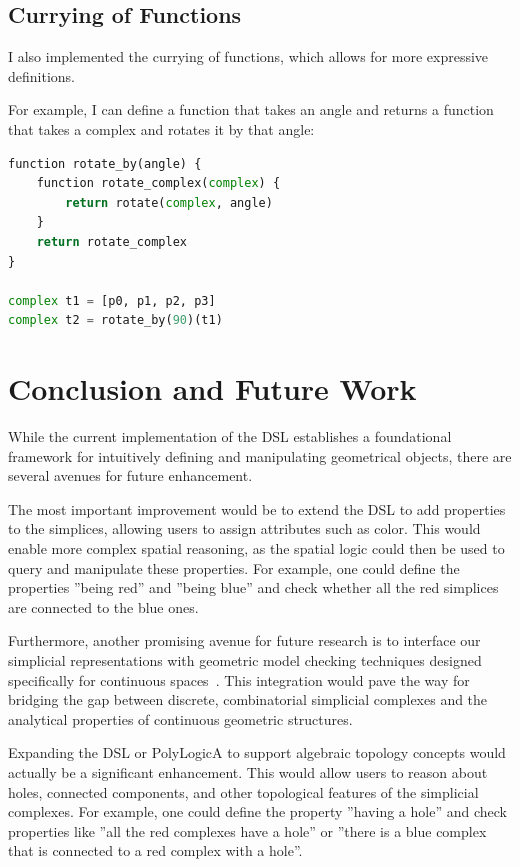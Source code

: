 \documentclass[11pt,a4paper]{article}
\begin{document}
\subsection{Currying of Functions}

I also implemented the currying of functions, which allows for more expressive definitions.

For example, I can define a function that takes an angle and returns a function that takes a complex and rotates it by that angle:

\newpage
    \begin{lstlisting}[language=Python, caption={DSL Code for Example 3}, label={lst:example3dsl}]
function rotate_by(angle) {
    function rotate_complex(complex) {
        return rotate(complex, angle)
    }
    return rotate_complex
}

complex t1 = [p0, p1, p2, p3]
complex t2 = rotate_by(90)(t1)

\end{lstlisting}

\section{Conclusion and Future Work}

While the current implementation of the DSL establishes a foundational framework for intuitively defining and manipulating geometrical objects, there are several avenues for future enhancement.

The most important improvement would be to extend the DSL to add properties to the simplices, allowing users to assign attributes such as color. This would enable more complex spatial reasoning, as the spatial logic could then be used to query and manipulate these properties. For example, one could define the properties ''being red'' and ''being blue'' and check whether all the red simplices are connected to the blue ones.

Furthermore, another promising avenue for future research is to interface our simplicial representations with geometric model checking techniques designed specifically for continuous spaces~\cite{geometric-model-checking}. This integration would pave the way for bridging the gap between discrete, combinatorial simplicial complexes and the analytical properties of continuous geometric structures.

Expanding the DSL or PolyLogicA to support algebraic topology concepts would actually be a significant enhancement. This would allow users to reason about holes, connected components, and other topological features of the simplicial complexes. For example, one could define the property ''having a hole'' and check properties like ''all the red complexes have a hole'' or ''there is a blue complex that is connected to a red complex with a hole''.
\end{document}
